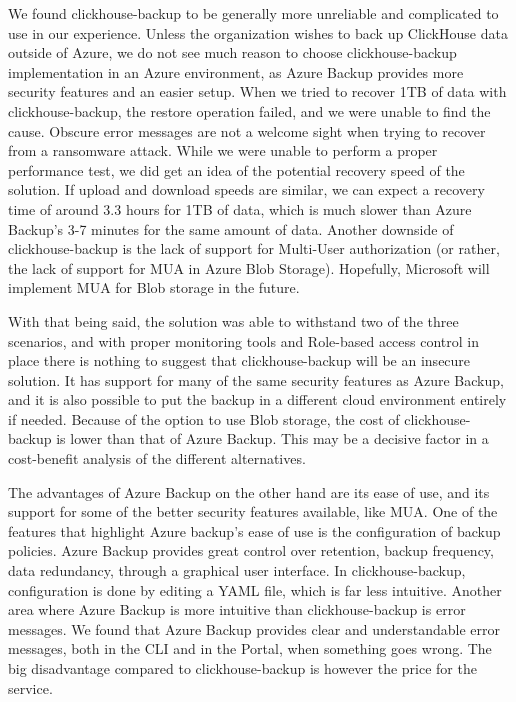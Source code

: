 We found clickhouse-backup to be generally more unreliable and complicated to use in our experience. Unless the organization wishes to back up ClickHouse data outside of Azure,  we do not see much reason to choose clickhouse-backup implementation in an Azure environment,  as Azure Backup provides more security features and an easier setup. When we tried to recover 1TB of data with clickhouse-backup, the restore operation failed, and we were unable to find the cause. Obscure error messages are not a welcome sight when trying to recover from a ransomware attack. While we were unable to perform a proper performance test, we did get an idea of the potential recovery speed of the solution. If upload and download speeds are similar, we can expect a recovery time of around 3.3 hours for 1TB of data, which is much slower than Azure Backup's 3-7 minutes for the same amount of data. Another downside of clickhouse-backup is the lack of support for Multi-User authorization  (or rather, the lack of support for MUA in Azure Blob Storage). Hopefully, Microsoft will implement MUA for Blob storage in the future.

With that being said, the solution was able to withstand two of the three scenarios,  and with proper monitoring tools and Role-based access control in place there is nothing to suggest that clickhouse-backup will be an insecure solution. It has support for many of the same security features as Azure Backup, and it is also possible to put the backup in a different cloud environment entirely if needed.  Because of the option to use Blob storage, the cost of clickhouse-backup is lower than that of Azure Backup. This may be a decisive factor in a cost-benefit analysis of the different alternatives. 

The advantages of Azure Backup on the other hand are its ease of use, and its support for some of the better security features available, like MUA. One of the features that highlight Azure backup's ease of use is the configuration of backup policies. Azure Backup provides great control over retention, backup frequency, data redundancy, through a graphical user interface. In clickhouse-backup, configuration is done by editing a YAML file, which is far less intuitive. Another area where Azure Backup is more intuitive than clickhouse-backup is error messages. We found that Azure Backup provides clear and understandable error messages, both in the CLI and in the Portal, when something goes wrong.  The big disadvantage compared to clickhouse-backup is however the price for the service. 

